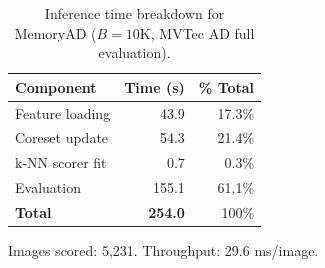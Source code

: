 \begin{table}[t]
\centering
\caption{Inference time breakdown for MemoryAD ($B=10\text{K}$, MVTec AD full evaluation).}
\label{tab:inference_speed}
\begin{tabular}{lrr}
\toprule
Component & Time (s) & \% Total \\
\midrule
Feature loading & 43.9 & 17.3\% \\
Coreset update & 54.3 & 21.4\% \\
k-NN scorer fit & 0.7 & 0.3\% \\
Evaluation & 155.1 & 61.1\% \\
\midrule
\textbf{Total} & \textbf{254.0} & 100\% \\
\bottomrule
\end{tabular}
\vspace{1mm}
\footnotesize{Images scored: 5,231. Throughput: 29.6 ms/image.}
\end{table}